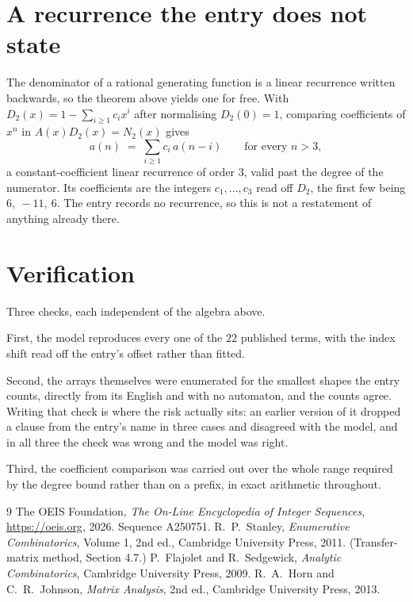 \documentclass[11pt,a4paper]{article}
\theoremstyle{plain}
\theoremstyle{definition}
\begin{document}
\section{A recurrence the entry does not state}

The denominator of a rational generating function is a linear recurrence written backwards, so
the theorem above yields one for free. With $D_2(x)=1-\sum_{i\ge1}c_ix^i$ after normalising
$D_2(0)=1$, comparing coefficients of $x^n$ in $A(x)D_2(x)=N_2(x)$ gives
\[
a(n)\;=\;\sum_{i\ge1}c_i\,a(n-i)\qquad\text{for every }n>3,
\]
a constant-coefficient linear recurrence of order $3$, valid past the degree of the
numerator. Its coefficients are the integers $c_1,\dots,c_{3}$ read off $D_2$, the first few being $6,\ -11,\ 6$. The entry records no recurrence, so this is not a restatement of anything
already there.

\section{Verification}

Three checks, each independent of the algebra above.

First, the model reproduces every one of the $22$ published terms, with the index shift
read off the entry's offset rather than fitted.

Second, the arrays themselves were enumerated for the smallest shapes the entry counts,
directly from its English and with no automaton, and the counts agree. Writing that check is
where the risk actually sits: an earlier version of it dropped a clause from the entry's name
in three cases and disagreed with the model, and in all three the check was wrong and the model
was right.

Third, the coefficient comparison was carried out over the whole range required by the degree
bound rather than on a prefix, in exact arithmetic throughout.

\begin{thebibliography}{9}
 The OEIS Foundation, \emph{The On-Line Encyclopedia of Integer
Sequences}, \url{https://oeis.org}, 2026. Sequence A250751.
 R.~P.~Stanley, \emph{Enumerative Combinatorics}, Volume 1, 2nd ed.,
Cambridge University Press, 2011. (Transfer-matrix method, Section 4.7.)
 P.~Flajolet and R.~Sedgewick, \emph{Analytic Combinatorics}, Cambridge
University Press, 2009.
 R.~A.~Horn and C.~R.~Johnson, \emph{Matrix Analysis}, 2nd ed., Cambridge
University Press, 2013.
\end{thebibliography}
\end{document}
